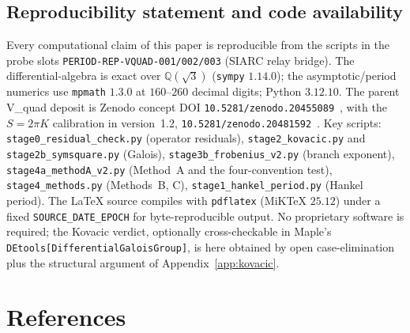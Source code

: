 \documentclass[11pt,reqno]{amsart}
\theoremstyle{plain}
\theoremstyle{definition}
\newcommand{\Qsqrt}{\mathbb{Q}(\sqrt3)}
\begin{document}
\subsection{Reproducibility statement and code availability}\label{app:repro}
Every computational claim of this paper is reproducible from the scripts in the probe slots
\texttt{PERIOD-REP-VQUAD-001/002/003} (SIARC relay bridge). The differential-algebra is exact over
$\Qsqrt$ (\texttt{sympy} $1.14.0$); the asymptotic/period numerics use \texttt{mpmath} $1.3.0$ at
$160$--$260$ decimal digits; Python $3.12.10$. The parent V\_quad deposit is Zenodo concept DOI
\texttt{10.5281/zenodo.20455089}~\cite{Vquad}, with the $S=2\pi K$ calibration in version~1.2,
\texttt{10.5281/zenodo.20481592}~\cite{StokesNote}. Key scripts:
\texttt{stage0\_residual\_check.py} (operator residuals), \texttt{stage2\_kovacic.py} and
\texttt{stage2b\_symsquare.py} (Galois), \texttt{stage3b\_frobenius\_v2.py} (branch exponent),
\texttt{stage4a\_methodA\_v2.py} (Method~A and the four-convention test),
\texttt{stage4\_methods.py} (Methods~B, C), \texttt{stage1\_hankel\_period.py} (Hankel period).
The LaTeX source compiles with \texttt{pdflatex} (MiKTeX $25.12$) under a fixed
\texttt{SOURCE\_DATE\_EPOCH} for byte-reproducible output. No proprietary software is required;
the Kovacic verdict, optionally cross-checkable in Maple's
\texttt{DEtools[DifferentialGaloisGroup]}, is here obtained by open case-elimination plus the
structural argument of Appendix~\ref{app:kovacic}.

\section*{References}
\end{document}
